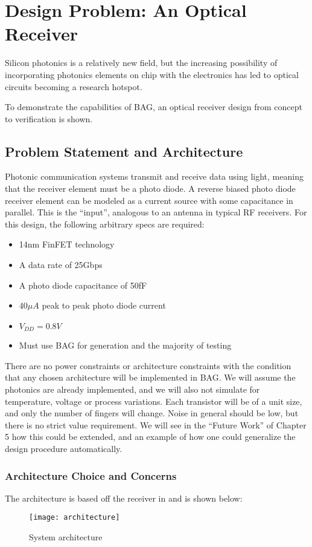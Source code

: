 \chapter{Design Problem: An Optical Receiver}

Silicon photonics is a relatively new field, but the increasing possibility of incorporating photonics elements on chip with the electronics has led to optical circuits becoming a research hotspot. 

To demonstrate the capabilities of BAG, an optical receiver design from concept to verification is shown.

\section{Problem Statement and Architecture}
Photonic communication systems transmit and receive data using light, meaning that the receiver element must be a photo diode. A reverse biased photo diode receiver element can be modeled as a current source with some capacitance in parallel. This is the ``input'', analogous to an antenna in typical RF receivers. For this design, the following arbitrary specs are required:
\begin{itemize}
\item 14nm FinFET technology
\item A data rate of 25Gbps
\item A photo diode capacitance of 50fF
\item $40\mu A$ peak to peak photo diode current
\item $V_{DD}=0.8V$
\item Must use BAG for generation and the majority of testing
\end{itemize}

There are no power constraints or architecture constraints with the condition that any chosen architecture will be implemented in BAG. We will assume the photonics are already implemented, and we will also not simulate for temperature, voltage or process variations. Each transistor will be of a unit size, and only the number of fingers will change. Noise in general should be low, but there is no strict value requirement. We will see in the ``Future Work'' of Chapter 5 how this could be extended, and an example of how one could generalize the design procedure automatically.

\subsection{Architecture Choice and Concerns}
The architecture is based off the receiver in \cite{settaluri_photonic_nodate} and is shown below:
\begin{figure}[h]
\centering
\texttt{[image: architecture]}
\caption{System architecture}
\label{fig:System Architecture}
\end{figure}

